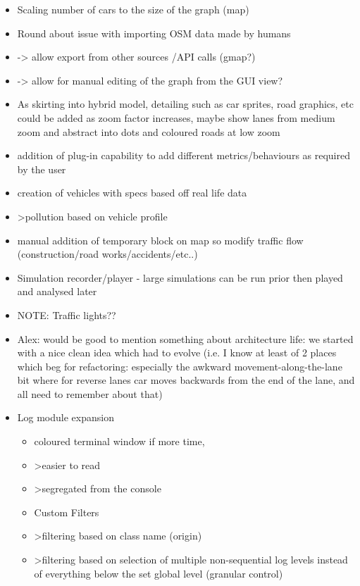 \begin{itemize}
	\item Scaling number of cars to the size of the graph  (map)
	\item Round about issue with importing OSM data made by humans 
	\item -> allow export from other sources /API calls (gmap?)
	\item -> allow for manual editing of the graph from the GUI view?
	\item As skirting into hybrid model, detailing such as car sprites, road graphics, etc could be added as zoom factor increases, maybe show lanes from medium zoom and abstract into dots and coloured roads at low zoom
	\item addition of plug-in capability to add different metrics/behaviours as required by the user
	\item creation of vehicles with specs based off real life data
	\item >pollution based on vehicle profile
	\item manual addition of temporary block on map so modify traffic flow (construction/road works/accidents/etc..)
	\item Simulation recorder/player - large simulations can be run prior then played and analysed later
	\item NOTE: Traffic lights??
	\item Alex: would be good to mention something about architecture life: we started with a nice clean idea which had to evolve (i.e. I know at least of 2 places which beg for refactoring: especially the awkward movement-along-the-lane bit where for reverse lanes car moves backwards from the end of the lane, and all need to remember about that)
\end{itemize}

\begin{itemize}
    \item Log module expansion
    \begin{itemize}
        \item coloured terminal window if more time,
        \item >easier to read
        \item >segregated from the console
        \item Custom Filters
        \item >filtering based on class name (origin)
        \item >filtering based on selection of multiple non-sequential log levels instead of everything below the set global level (granular control)
    \end{itemize}
\end{itemize}

